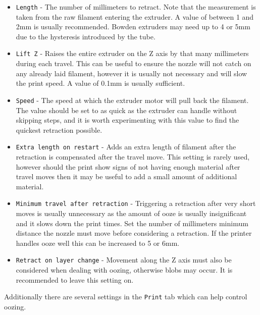 \begin{itemize}
    \item \texttt{Length} - The number of millimeters to retract.  Note that the measurement is taken from the raw filament entering the extruder.  A value of between 1 and 2mm is usually recommended. Bowden extruders may need up to 4 or 5mm due to the hysteresis introduced by the tube.
    \item \texttt{Lift Z} - Raises the entire extruder on the Z axis by that many millimeters during each travel.  This can be useful to ensure the nozzle will not catch on any already laid filament, however it is usually not necessary and will slow the print speed.  A value of 0.1mm is usually sufficient.
    \item \texttt{Speed} - The speed at which the extruder motor will pull back the filament.  The value should be set to as quick as the extruder can handle without skipping steps, and it is worth experimenting with this value to find the quickest retraction possible.
    \item \texttt{Extra length on restart} -  Adds an extra length of filament after the retraction is compensated after the travel move. This setting is rarely used, however should the print show signs of not having enough material after travel moves then it may be useful to add a small amount of additional material.
    \item \texttt{Minimum travel after retraction} - Triggering a retraction after very short moves is usually unnecessary as the amount of ooze is usually insignificant and it slows down the print times.  Set the number of millimeters minimum distance the nozzle must move before considering a retraction.  If the printer handles ooze well this can be increased to 5 or 6mm.
    \item \texttt{Retract on layer change} - Movement along the Z axis must also be considered when dealing with oozing, otherwise blobs may occur.  It is recommended to leave this setting on.
\end{itemize}


Additionally there are several settings in the \texttt{Print} tab which can help control oozing.

